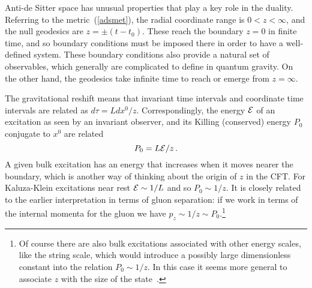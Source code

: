 \documentclass[12pt]{article}
\begin{document}
{Anti-de Sitter space has unusual properties that play a key role in the duality.  Referring to the metric~(\ref{adsmet}), the radial coordinate range is $0 < z < \infty$, and the null geodesics are
$z = \pm (t - t_0)$.  These reach the boundary $z=0$ in finite time, and so boundary conditions must be imposed there in order to have a well-defined system.  These boundary conditions also provide a natural set of observables, which generally are complicated to define in quantum gravity.
On the other hand, the geodesics take infinite time to reach or emerge from $z = \infty$.

The gravitational reshift means that invariant time intervals and coordinate time intervals are related  as $d\tau = L dx^0/z$.  Correspondingly, the energy $\cal E$ of an excitation as seen by an invariant observer, and its Killing (conserved) energy $P_0$ conjugate to $x^0$ are related
\begin{equation}
P_0 = L {\cal E}/z \,.
\end{equation}
A given bulk excitation has an energy that increases when it moves nearer the boundary, which is another way of thinking about the origin of $z$ in the CFT.  For Kaluza-Klein excitations near rest ${\cal E} \sim 1/L$ and so $P_0 \sim 1/z$.  It is closely related to the earlier interpretation in terms of gluon separation: if we work in terms of the internal momenta for the gluon we have $p_z \sim 1/z \sim P_0$.\footnote{Of course there are also bulk excitations associated with other energy scales, like the string scale, which would introduce a possibly large dimensionless constant into the relation $P_0 \sim 1/z$.  In this case it seems more general to associate $z$ with the size of the state~\cite {Susskind:1998dq}.}

}
\end{document}
